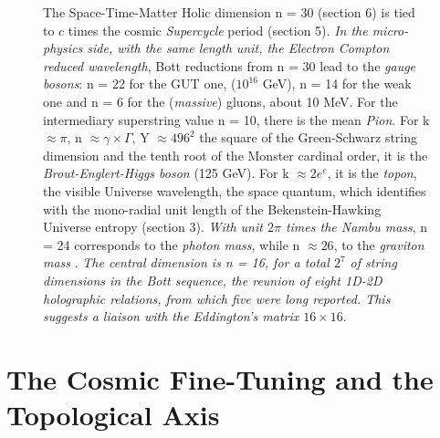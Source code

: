 \documentclass[twoside,draft]{article}
\begin{document}
\begin{sloppypar}
\begin{figure}
{The Space-Time-Matter Holic dimension n = 30 (section 6) is tied to $c$ times the cosmic \textit{Supercycle} period (section 5). 
\textit{In the micro-physics side, with the same length unit, the Electron Compton reduced wavelength}, Bott reductions from n = 30 lead to the \textit{gauge bosons}: n = 22 for the GUT one, ($10^{16}$ GeV), n = 14 for the weak one and n = 6 for the (\textit{massive}) gluons, about 10 MeV.
For the intermediary superstring value n = 10, there is the mean \textit{Pion}. For k $\approx \pi$, n $\approx \gamma \times \Gamma$, Y $\approx 496^2$ the square of the Green-Schwarz string dimension and the tenth root of the Monster cardinal order, it is the \textit{Brout-Englert-Higgs boson} (125 GeV). For k $\approx 2e^e$, it is the \textit{topon}, the visible Universe wavelength, the space quantum, which identifies with the mono-radial unit length of the Bekenstein-Hawking Universe entropy (section 3).
   \textit{With unit $2\pi$ times the Nambu mass}, n = 24 corresponds to the \textit{photon mass}, while n $\approx 26$, to the \textit{graviton mass} \cite{Sanchez1}.}
    \textit{The central dimension is n = 16, for a total $2^7$ of string dimensions in the Bott sequence, the reunion of eight 1D-2D holographic relations, from which five were long reported. This suggests a liaison with the Eddington's matrix $16\times 16$}.
\label{fig:figure_label}
\end{figure}


\section {The Cosmic Fine-Tuning and the Topological Axis}


\end{sloppypar}
\end{document}
